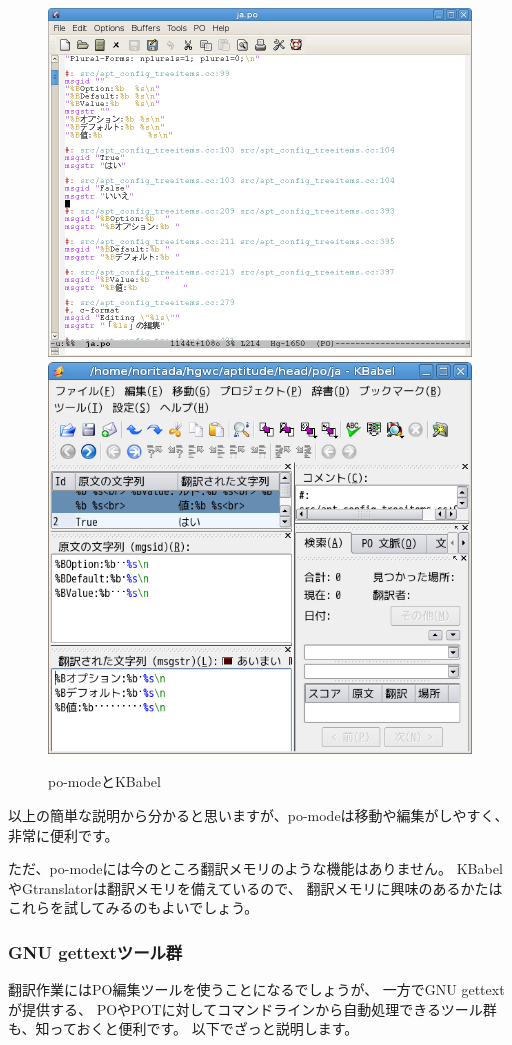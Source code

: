 \documentclass[mingoth,a4paper]{jsarticle}
\begin{document}
\begin{figure}[htbp]
 \begin{center}
  \includegraphics[width=0.4\hsize]{image200809/po-mode.png}
  \includegraphics[width=0.4\hsize]{image200809/KBabel.png}
 \end{center}
 \caption{po-modeとKBabel}
 \label{fig:po-editors}
\end{figure}

以上の簡単な説明から分かると思いますが、po-modeは移動や編集がしやすく、
非常に便利です。

ただ、po-modeには今のところ翻訳メモリのような機能はありません。
KBabelやGtranslatorは翻訳メモリを備えているので、
翻訳メモリに興味のあるかたはこれらを試してみるのもよいでしょう。

\subsubsection{GNU gettextツール群}

翻訳作業にはPO編集ツールを使うことになるでしょうが、
一方でGNU gettextが提供する、
POやPOTに対してコマンドラインから自動処理できるツール群も、知っておくと便利です。
以下でざっと説明します。
\end{document}
